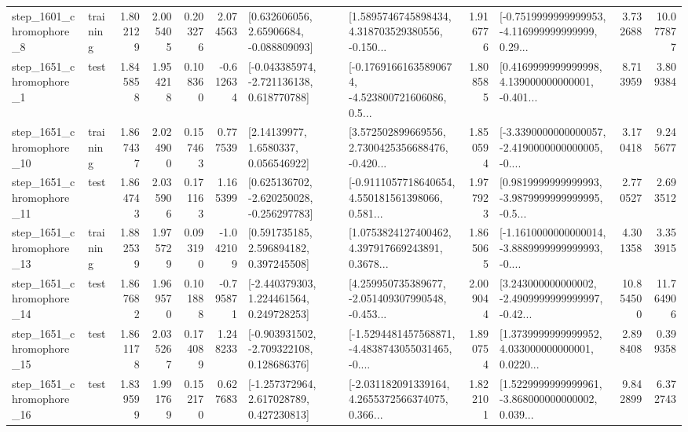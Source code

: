 \begin{tabular}{llrrrrllrlrr}
  step\_1601\_chromophore\_8 &  training &      1.802129 &    2.005405 &      0.203276 &  2.074563 &     [0.632606056, 2.65906684, -0.088809093] &  [1.5895746745898434, 4.318703529380556, -0.150... &       1.916776 &  [-0.7519999999999953, -4.116999999999999, 0.29... &            3.732688 &         10.077877 \\
  step\_1651\_chromophore\_1 &      test &      1.845858 &    1.954218 &      0.108360 & -0.612634 &   [-0.043385974, -2.721136138, 0.618770788] &  [-0.17691661635890674, -4.523800721606086, 0.5... &       1.808585 &  [0.4169999999999998, 4.139000000000001, -0.401... &            8.713959 &          3.809384 \\
 step\_1651\_chromophore\_10 &  training &      1.867437 &    2.024900 &      0.157463 &  0.777539 &        [2.14139977, 1.6580337, 0.056546922] &  [3.572502899669556, 2.7300425356688476, -0.420... &       1.850594 &  [-3.3390000000000057, -2.4190000000000005, -0.... &            3.170418 &          9.245677 \\
 step\_1651\_chromophore\_11 &      test &      1.864743 &    2.035906 &      0.171163 &  1.165399 &   [0.625136702, -2.620250028, -0.256297783] &  [-0.9111057718640654, 4.550181561398066, 0.581... &       1.977923 &  [0.9819999999999993, -3.9879999999999995, -0.5... &            2.770527 &          2.693512 \\
 step\_1651\_chromophore\_13 &  training &      1.882539 &    1.975729 &      0.093190 & -1.042109 &     [0.591735185, 2.596894182, 0.397245508] &  [1.0753824127400462, 4.397917669243891, 0.3678... &       1.865065 &  [-1.1610000000000014, -3.8889999999999993, -0.... &            4.301358 &          3.353915 \\
 step\_1651\_chromophore\_14 &      test &      1.867682 &    1.969570 &      0.101888 & -0.795871 &    [-2.440379303, 1.224461564, 0.249728253] &  [4.259950735389677, -2.051409307990548, -0.453... &       2.009044 &  [3.243000000000002, -2.4909999999999997, -0.42... &           10.854500 &         11.764906 \\
 step\_1651\_chromophore\_15 &      test &      1.861178 &    2.035267 &      0.174089 &  1.248233 &   [-0.903931502, -2.709322108, 0.128686376] &  [-1.5294481457568871, -4.4838743055031465, -0.... &       1.890754 &  [1.3739999999999952, 4.033000000000001, 0.0220... &            2.898408 &          0.399358 \\
 step\_1651\_chromophore\_16 &      test &      1.839599 &    1.991769 &      0.152170 &  0.627683 &    [-1.257372964, 2.617028789, 0.427230813] &  [-2.031182091339164, 4.2655372566374075, 0.366... &       1.822101 &  [1.5229999999999961, -3.868000000000002, 0.039... &            9.842899 &          6.372743 \\

\end{tabular}
